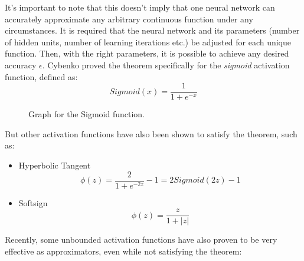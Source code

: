 It's important to note that this doesn't imply that one neural network can accurately approximate any arbitrary continuous function under any circumstances. It is required that the neural network and its parameters (number of hidden units, number of learning iterations etc.) be adjusted for each unique function. Then, with the right parameters, it is possible to achieve any desired accuracy $\epsilon$.
Cybenko proved the theorem specifically for the \textit{sigmoid} activation function, defined as:
\[Sigmoid(x)=\dfrac{1}{1+e^{-x}}\]
\begin{figure}[H]
\caption{Graph for the Sigmoid function.}
\end{figure}
But other activation functions have also been shown to satisfy the theorem, such as:
\begin{itemize}
    \item Hyperbolic Tangent
    \[
        \phi(z) = \frac{2}{1+e^{-2z}}-1 = 2Sigmoid(2z) - 1    
    \]
    \item Softsign
    \[
        \phi(z) = \frac{z}{1+|z|}
    \]
\end{itemize}
Recently, some unbounded activation functions have also proven to be very effective as approximators, even while not satisfying the theorem:
